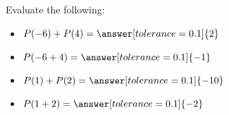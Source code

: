\documentclass{ximera}
\begin{document}
\begin{exercise}
\begin{question}
Evaluate the following:

\begin{itemize}
\item $P(-6) + P(4) = \answer[tolerance=0.1]{2}$ \\
\item $P(-6+4) = \answer[tolerance=0.1]{-1}$ \\
\item $P(1) + P(2)  = \answer[tolerance=0.1]{-10}$ \\
\item $P(1+2) = \answer[tolerance=0.1]{-2}$ \\
\end{itemize}
\end{question}



















\end{exercise}
\end{document}
